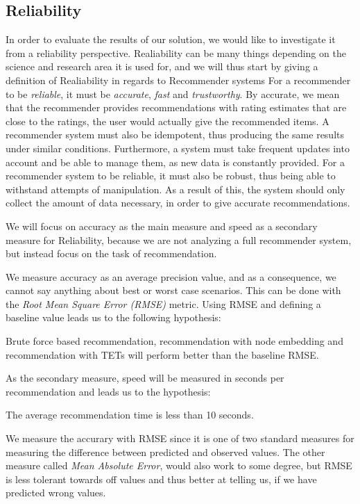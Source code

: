 \subsection{Reliability}\label{Subsec:Reliability_definition}
In order to evaluate the results of our solution, we would like to investigate it from a reliability perspective. Realiability can be many things depending on the science and research area it is used for, and we will thus start by giving a definition of Realiability in regards to Recommender systems
For a recommender to be \textit{reliable}, it must be \textit{accurate}, \textit{fast} and \textit{trustworthy}.
By accurate, we mean that the recommender provides recommendations with rating estimates that are close to the ratings, the user would actually give the recommended items.
A recommender system must also be idempotent, thus producing the same results under similar conditions. Furthermore, a system must take frequent updates into account and be able to manage them, as new data is constantly provided.
For a recommender system to be reliable, it must also be robust, thus being able to withstand attempts of manipulation. As a result of this, the system should only collect the amount of data necessary, in order to give accurate recommendations.

 We will focus on accuracy as the main measure and speed as a secondary measure for Reliability, because we are not analyzing a full recommender system, but instead focus on the task of recommendation.


We measure accuracy as an average precision value, and as a consequence, we cannot say anything about best or worst case scenarios. This can be done with the \textit{Root Mean Square Error (RMSE)} metric. Using RMSE and defining a baseline value leads us to the following hypothesis:
\begin{hypothesis}\label{RMSE_hypothesis}
  Brute force based recommendation, recommendation with node embedding and recommendation with TETs will perform better than the baseline RMSE.
\end{hypothesis}
As the secondary measure, speed will be measured in seconds per recommendation and leads us to the hypothesis:
\begin{hypothesis}\label{Speed_hypothesis}
  The average recommendation time is less than 10 seconds.
\end{hypothesis}

We measure the accurary with RMSE since it is one of two standard measures for measuring the difference between predicted and observed values. The other measure called \textit{Mean Absolute Error}, would also work to some degree, but RMSE is less tolerant towards off values and thus better at telling us, if we have predicted wrong values.  

